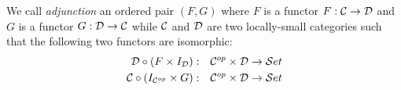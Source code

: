\begin{defin}
    We call {\em adjunction} an ordered pair $(F,G)$ where $F$ is a functor
    $F:{\cal C}\to{\cal D}$ and $G$ is a functor $G:{\cal D}\to{\cal C}$
    while ${\cal C}$ and ${\cal D}$ are two locally-small categories such
    that the following two functors are isomorphic:
        \begin{eqnarray*}
            {\cal D}\circ(F\times I_{\cal D})
            &:&
            {\cal C}^{op}\times {\cal D}\to{\cal S}et\\
            {\cal C}\circ(I_{{\cal C}^{op}}\times G)
            &:&
            {\cal C}^{op}\times{\cal D}\to{\cal S}et
        \end{eqnarray*}
\end{defin}

